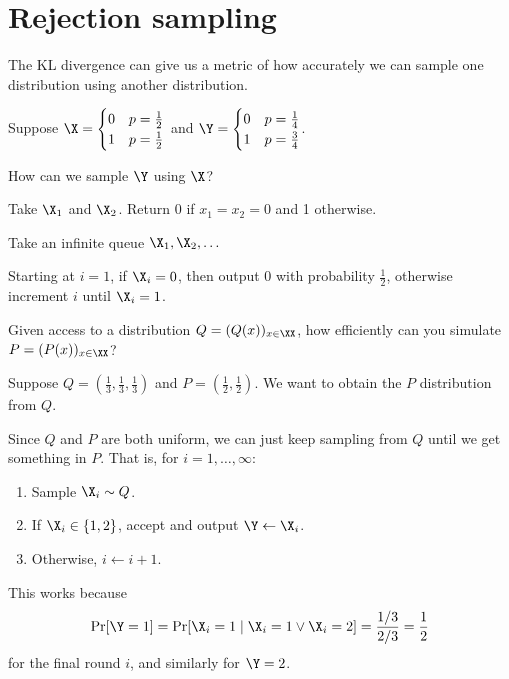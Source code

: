 \documentclass[class=co432,notes,tikz]{agony}
\begin{document}
\section{Rejection sampling}

The KL divergence can give us a metric of how accurately we can sample
one distribution using another distribution.

\begin{example}
  Suppose $\X = \begin{cases}
      0 & p=\frac12 \\
      1 & p=\frac12
    \end{cases}$ and $\Y = \begin{cases}
      0 & p=\frac14 \\
      1 & p=\frac34
    \end{cases}$.

  How can we sample $\Y$ using $\X$?
\end{example}
\begin{sol}[naive]
  Take \iid $\X_1$ and $\X_2$.
  Return 0 if $x_1 = x_2 = 0$ and 1 otherwise.
\end{sol}
\begin{sol}[fancy]
  Take an infinite \iid queue $\X_1,\X_2,\dotsc$

  Starting at $i = 1$, if $\X_i = 0$, then output 0 with probability $\frac12$,
  otherwise increment $i$ until $\X_i = 1$.
\end{sol}


\begin{problem}
  Given access to a distribution $Q = (Q(x))_{x \in \XX}$,
  how efficiently can you simulate $P = (P(x))_{x \in \XX}$?
\end{problem}

\begin{example}
  Suppose $Q = (\frac13,\frac13,\frac13)$ and $P = (\frac12,\frac12)$.
  We want to obtain the $P$ distribution from $Q$.
\end{example}
\begin{sol}
  Since $Q$ and $P$ are both uniform, we can just keep sampling from $Q$
  until we get something in $P$. That is, for $i = 1,\dotsc,\infty$:
  \begin{enumerate}
    \item Sample $\X_i \sim Q$.
    \item If $\X_i \in \{1,2\}$, accept and output $\Y \gets \X_i$.
    \item Otherwise, $i \gets i + 1$.
  \end{enumerate}
  This works because
  \[ \Pr[\Y = 1] = \Pr[\X_i = 1 \mid \X_i = 1 \lor \X_i = 2] = \frac{1/3}{2/3} = \frac12 \]
  for the final round $i$, and similarly for $\Y = 2$.
\end{sol}
\end{document}
